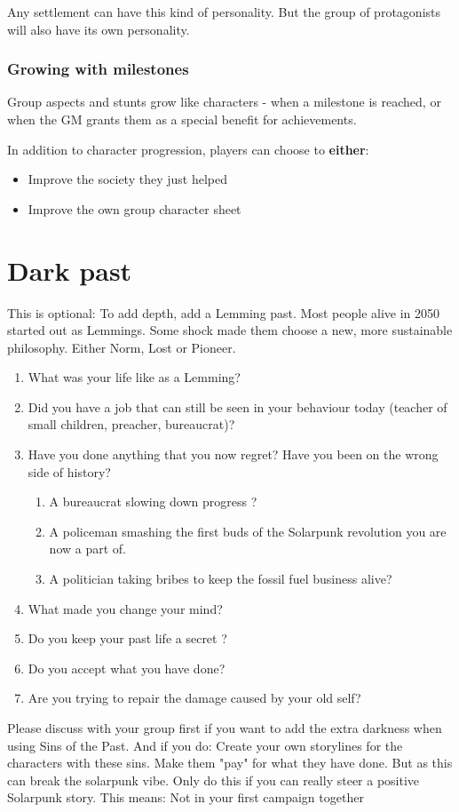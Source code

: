 Any settlement can have this kind of personality. But the group of protagonists will also have its own personality.

\subsubsection{Growing with milestones}

Group aspects and stunts grow like characters - when a milestone is reached, or when the GM grants them as a special benefit for achievements.

In addition to character progression, players can choose to \textbf{either}:

\begin{itemize}
    \item Improve the society they just helped
    \item Improve the own group character sheet
\end{itemize}


\section{Dark past}

This is optional: To add depth, add a Lemming past. Most people alive in 2050 started out as Lemmings. Some shock made them choose a new, more sustainable philosophy. Either Norm, Lost or Pioneer.

\begin{enumerate}
    \item What was your life like as a Lemming?
    \item Did you have a job that can still be seen in your behaviour today (teacher of small children, preacher, bureaucrat)?
    \item Have you done anything that you now regret? Have you been on the wrong side of history?
    \begin{enumerate}
        \item A bureaucrat slowing down progress ?
        \item A policeman smashing the first buds of the Solarpunk revolution you are now a part of.
        \item A politician taking bribes to keep the fossil fuel business alive?
    \end{enumerate}
    \item What made you change your mind?
    \item Do you keep your past life a secret ?
    \item Do you accept what you have done?
    \item Are you trying to repair the damage caused by your old self?
\end{enumerate}

Please discuss with your group first if you want to add the extra darkness when using Sins of the Past. And if you do: Create your own storylines for the characters with these sins. Make them "pay" for what they have done. But as this can break the solarpunk vibe. Only do this if you can really steer a positive Solarpunk story. This means: Not in your first campaign together